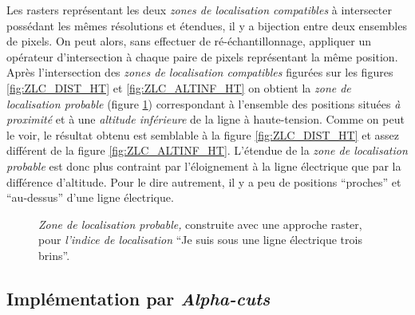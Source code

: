 Les rasters représentant les deux \emph{zones de localisation
  compatibles} à intersecter possédant les mêmes résolutions et
étendues, il y a bijection entre deux ensembles de pixels. On peut
alors, sans effectuer de ré-échantillonnage, appliquer un opérateur
d'intersection à chaque paire de pixels représentant la même
position. Après l'intersection des \emph{zones de localisation
  compatibles} figurées sur les figures \ref{fig:ZLC_DIST_HT} et
\ref{fig:ZLC_ALTINF_HT} on obtient la \emph{zone de localisation
  probable} (figure \ref{fig:ZLP_SOUS_HT}) correspondant à l'ensemble
des positions situées \emph{à proximité} et à une \emph{altitude
  inférieure} de la ligne à haute-tension. Comme on peut le voir, le
résultat obtenu est semblable à la figure \ref{fig:ZLC_DIST_HT} et
assez différent de la figure \ref{fig:ZLC_ALTINF_HT}. L'étendue de la
\emph{zone de localisation probable} est donc plus contraint par
l'éloignement à la ligne électrique que par la différence
d'altitude. Pour le dire autrement, il y a peu de positions
\enquote{proches} et \enquote{au-dessus} d'une ligne électrique.

\begin{figure}
  \centering
  
  \caption{\emph{Zone de localisation probable,} construite avec une
    approche raster, pour \emph{l'indice de localisation} \enquote{Je
      suis sous une ligne électrique trois brins}.}
  \label{fig:ZLP_SOUS_HT}
\end{figure}

\subsection{Implémentation par \emph{Alpha-cuts}}

